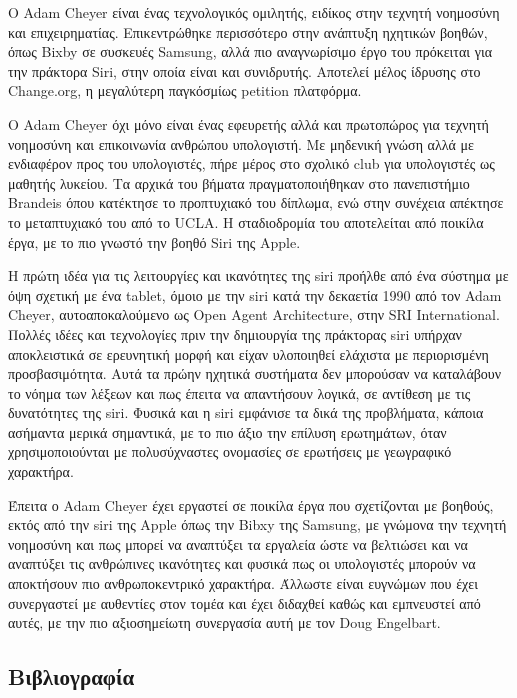 \documentclass[
]{article}
\begin{document}
Ο Adam Cheyer είναι ένας τεχνολογικός ομιλητής, ειδίκος στην τεχνητή
νοημοσύνη και επιχειρηματίας. Επικεντρώθηκε περισσότερο στην ανάπτυξη
ηχητικών βοηθών, όπως Bixby σε συσκευές Samsung, αλλά πιο αναγνωρίσιμο
έργο του πρόκειται για την πράκτορα Siri, στην οποία είναι και
συνιδρυτής. Αποτελεί μέλος ίδρυσης στο Change.org, η μεγαλύτερη
παγκόσμίως petition πλατφόρμα.

Ο Adam Cheyer όχι μόνο είναι ένας εφευρετής αλλά και πρωτοπώρος για
τεχνητή νοημοσύνη και επικοινωνία ανθρώπου υπολογιστή. Με μηδενική γνώση
αλλά με ενδιαφέρον προς του υπολογιστές, πήρε μέρος στο σχολικό club για
υπολογιστές ως μαθητής λυκείου. Τα αρχικά του βήματα πραγματοποιήθηκαν
στο πανεπιστήμιο Brandeis όπου κατέκτησε το προπτυχιακό του δίπλωμα, ενώ
στην συνέχεια απέκτησε το μεταπτυχιακό του από το UCLA. Η σταδιοδρομία
του αποτελείται από ποικίλα έργα, με το πιο γνωστό την βοηθό Siri της
Apple.

Η πρώτη ιδέα για τις λειτουργίες και ικανότητες της siri προήλθε από ένα
σύστημα με όψη σχετική με ένα tablet, όμοιο με την siri κατά την
δεκαετία 1990 από τον Adam Cheyer, αυτοαποκαλούμενο ως Open Agent
Architecture, στην SRI International. Πολλές ιδέες και τεχνολογίες πριν
την δημιουργία της πράκτορας siri υπήρχαν αποκλειστικά σε ερευνητική
μορφή και είχαν υλοποιηθεί ελάχιστα με περιορισμένη προσβασιμότητα. Αυτά
τα πρώην ηχητικά συστήματα δεν μπορούσαν να καταλάβουν το νόημα των
λέξεων και πως έπειτα να απαντήσουν λογικά, σε αντίθεση με τις
δυνατότητες της siri. Φυσικά και η siri εμφάνισε τα δικά της προβλήματα,
κάποια ασήμαντα μερικά σημαντικά, με το πιο άξιο την επίλυση ερωτημάτων,
όταν χρησιμοποιούνται με πολυσύχναστες ονομασίες σε ερωτήσεις με
γεωγραφικό χαρακτήρα.

Έπειτα ο Adam Cheyer έχει εργαστεί σε ποικίλα έργα που σχετίζονται με
βοηθούς, εκτός από την siri της Apple όπως την Bibxy της Samsung, με
γνώμονα την τεχνητή νοημοσύνη και πως μπορεί να αναπτύξει τα εργαλεία
ώστε να βελτιώσει και να αναπτύξει τις ανθρώπινες ικανότητες και φυσικά
πως οι υπολογιστές μπορούν να αποκτήσουν πιο ανθρωποκεντρικό χαρακτήρα.
Άλλωστε είναι ευγνώμων που έχει συνεργαστεί με αυθεντίες στον τομέα και
έχει διδαχθεί καθώς και εμπνευστεί από αυτές, με την πιο αξιοσημείωτη
συνεργασία αυτή με τον Doug Engelbart.

\hypertarget{ux3b2ux3b9ux3b2ux3bbux3b9ux3bfux3b3ux3c1ux3b1ux3c6ux3afux3b1}{%
\subsection*{Βιβλιογραφία}\label{ux3b2ux3b9ux3b2ux3bbux3b9ux3bfux3b3ux3c1ux3b1ux3c6ux3afux3b1}}
\end{document}
